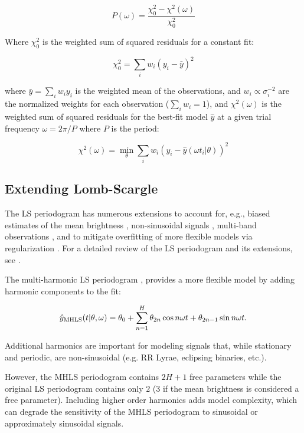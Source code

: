\documentclass{aastex62}
\begin{document}
\begin{equation}
\label{eq:lsp}
P(\omega) = \frac{\chi^2_0 - \chi^2(\omega)}{\chi^2_0}
\end{equation}

Where $\chi^2_0$ is the weighted sum of squared residuals for a constant fit:

\begin{equation}
\chi^2_0 = \sum_i w_i (y_i - \bar{y})^2
\end{equation}

where $\bar{y} = \sum_i w_i y_i$ is the weighted mean of the observations, and
$w_i \propto \sigma_i^{-2}$ are the normalized weights for each observation ($\sum_i w_i = 1$),
and $\chi^2(\omega)$ is the weighted sum of squared residuals for the best-fit model $\hat{y}$ at
a given trial frequency $\omega = 2\pi / P$ where $P$ is the period:

\begin{equation}
\chi^2(\omega) = \min_{\theta} \sum_i w_i (y_i - \hat{y}(\omega t_i | \theta))^2
\end{equation}


\subsection{Extending Lomb-Scargle}

The LS periodogram has numerous extensions to account for, e.g., biased estimates of the mean brightness
\citep{Zechmeister+Kurster_2009}, non-sinusoidal signals \citep{Schwarzenberg-Czerny_1996,Palmer_2009},
multi-band observations \citep{Vanderplas+Ivezic_2015}, and to mitigate overfitting of more
flexible models via regularization \citep{Vanderplas+Ivezic_2015}. For a detailed review
of the LS periodogram and its extensions, see \cite{Vanderplas_2018}.

The multi-harmonic LS periodogram \citep[][MHGLS]{Bretthorst+Chi-Cheng_1988,Schwarzenberg-Czerny_1996,Palmer_2009}, provides a more
flexible model by adding harmonic components to the fit:

\begin{equation}
    \hat{y}_{\rm MHLS}(t|\theta, \omega) = \theta_0 + \sum_{n=1}^H \theta_{2n}\cos{n\omega t} + \theta_{2n-1}\sin{n\omega t}.
\end{equation}

Additional harmonics are important for modeling signals that, while stationary and periodic,
are non-sinusoidal (e.g. RR Lyrae, eclipsing binaries, etc.).

However, the MHLS periodogram contains $2H+1$ free parameters while the original LS periodogram
contains only $2$ ($3$ if the mean brightness is considered a free parameter). Including higher order
harmonics adds model complexity, which can degrade the sensitivity of the MHLS periodogram to
sinusoidal or approximately sinusoidal signals.
\end{document}
